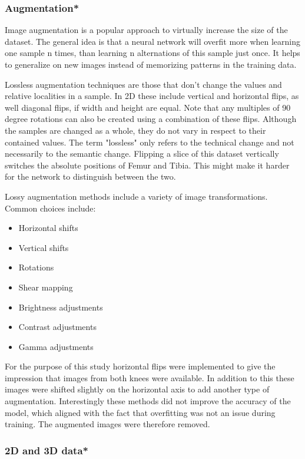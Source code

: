 \subsubsection{Augmentation*}

Image augmentation is a popular approach to virtually increase the size of the dataset. The general idea is that a neural network will overfit more when learning one sample n times, than learning n alternations of this sample just once. It helps to generalize on new images instead of memorizing patterns in the training data.

Lossless augmentation techniques are those that don't change the values and relative localities in a sample. In 2D these include vertical and horizontal flips, as well diagonal flips, if width and height are equal. Note that any multiples of 90 degree rotations can also be created using a combination of these flips. Although the samples are changed as a whole, they do not vary in respect to their contained values. The term "lossless" only refers to the technical change and not necessarily to the semantic change. Flipping a slice of this dataset vertically switches the absolute positions of Femur and Tibia. This might make it harder for the network to distinguish between the two.

Lossy augmentation methods include a variety of image transformations. Common choices include:

\begin{itemize}
\item Horizontal shifts
\item Vertical shifts
\item Rotations
\item Shear mapping
\item Brightness adjustments
\item Contrast adjustments
\item Gamma adjustments
\end{itemize}

For the purpose of this study horizontal flips were implemented to give the impression that images from both knees were available. In addition to this these images were shifted slightly on the horizontal axis to add another type of augmentation. Interestingly these methods did not improve the accuracy of the model, which aligned with the fact that overfitting was not an issue during training. The augmented images were therefore removed.

\subsubsection{2D and 3D data*}

